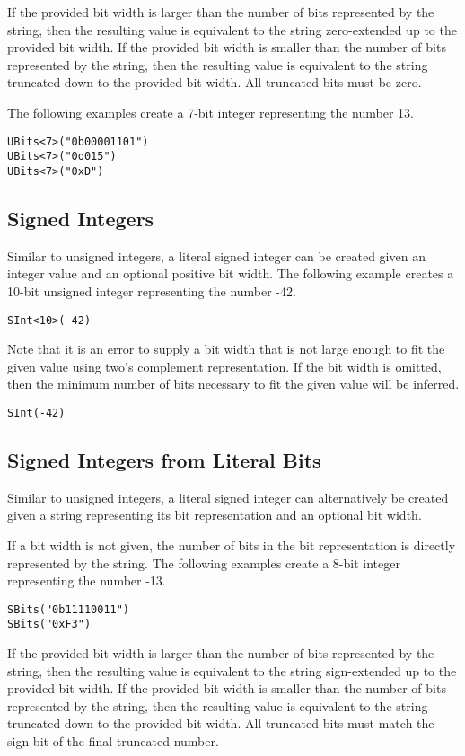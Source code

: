 \documentclass[12pt]{article}
\begin{document}
If the provided bit width is larger than the number of bits represented by the string, then the resulting value is equivalent to the string zero-extended up to the provided bit width. If the provided bit width is smaller than the number of bits represented by the string, then the resulting value is equivalent to the string truncated down to the provided bit width. All truncated bits must be zero.

The following examples create a 7-bit integer representing the number 13.
\begin{verbatim}
UBits<7>("0b00001101")
UBits<7>("0o015")
UBits<7>("0xD")
\end{verbatim}

\subsection{Signed Integers}

Similar to unsigned integers, a literal signed integer can be created given an integer value and an optional positive bit width. The following example creates a 10-bit unsigned integer representing the number -42. 
\begin{verbatim}
SInt<10>(-42)
\end{verbatim}

Note that it is an error to supply a bit width that is not large enough to fit the given value using two's complement representation. If the bit width is omitted, then the minimum number of bits necessary to fit the given value will be inferred.
\begin{verbatim}
SInt(-42)
\end{verbatim}

\subsection{Signed Integers from Literal Bits}

Similar to unsigned integers, a literal signed integer can alternatively be created given a string representing its bit representation and an optional bit width. 

If a bit width is not given, the number of bits in the bit representation is directly represented by the string. The following examples create a 8-bit integer representing the number -13.
\begin{verbatim}
SBits("0b11110011")
SBits("0xF3")
\end{verbatim}

If the provided bit width is larger than the number of bits represented by the string, then the resulting value is equivalent to the string sign-extended up to the provided bit width. If the provided bit width is smaller than the number of bits represented by the string, then the resulting value is equivalent to the string truncated down to the provided bit width. All truncated bits must match the sign bit of the final truncated number.
\end{document}
